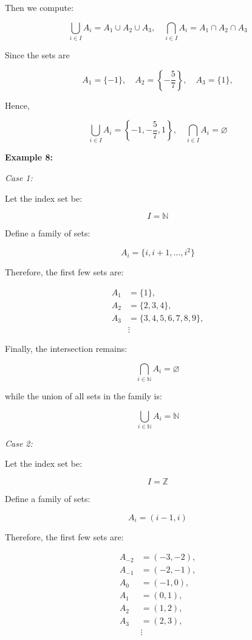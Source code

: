 \documentclass[12pt,a4paper,openany]{article}
\begin{document}
Then we compute:

$$
\displaystyle \bigcup_{i \in I} A_i = A_1 \cup A_2 \cup A_3, 
\quad
\displaystyle \bigcap_{i \in I} A_i = A_1 \cap A_2 \cap A_3
$$

Since the sets are

$$
A_1 = \{-1\}, \quad A_2 = \left\{-\frac{5}{7}\right\}, \quad A_3 = \{1\},
$$

Hence,

$$
\boxed{\displaystyle \bigcup_{i \in I} A_i = \left\{-1, -\frac{5}{7}, 1\right\}, \quad \displaystyle \bigcap_{i \in I} A_i = \varnothing}
$$

\textbf{Example 8:}

\textit{Case 1:}

Let the index set be:

$$
I = \mathbb{N}
$$

Define a family of sets:

$$
A_i = \{ i, i+1, \dots, i^2 \}
$$

Therefore, the first few sets are:

$$
\begin{aligned}
A_1 &= \{1\}, \\
A_2 &= \{2, 3, 4\}, \\
A_3 &= \{3, 4, 5, 6, 7, 8, 9\}, \\
&\vdots
\end{aligned}
$$

Finally, the intersection remains:

$$
\displaystyle\bigcap_{i \in \mathbb{N}} A_i = \varnothing
$$

while the union of all sets in the family is:

$$
\displaystyle\bigcup_{i \in \mathbb{N}} A_i = \mathbb{N}
$$

\textit{Case 2:}

Let the index set be:

$$
I = \mathbb{Z}
$$

Define a family of sets:

$$
A_i = (i-1, i)
$$

Therefore, the first few sets are:

$$
\begin{aligned}
A_{-2} &= (-3, -2), \\
A_{-1} &= (-2, -1), \\
A_0 &= (-1, 0), \\
A_1 &= (0, 1), \\
A_2 &= (1, 2), \\
A_3 &= (2, 3), \\
&\vdots
\end{aligned}
$$
\end{document}
